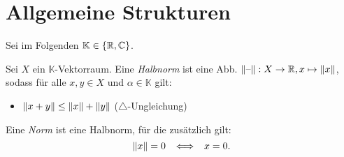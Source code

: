 \documentclass{cheat-sheet}
\newcommand{\K}{\mathbb{K}}
\begin{document}




\section{Allgemeine Strukturen}

\begin{nota}
  Sei im Folgenden $\K \in \{ \R, \C \}$.
\end{nota}

\begin{definition}
  Sei $X$ ein $\K$-Vektorraum. Eine \emph{Halbnorm} ist eine Abb. $\lVert\text{--}\rVert : X \to \mathbb{R}, x \mapsto \lVert x\rVert$, sodass für alle $x, y \in X$ und $\alpha \in \K$ gilt:
  \begin{itemize}
    \item $\lVert x + y\rVert \leq \lVert x\rVert + \lVert y\rVert$ \enspace ($\triangle$-Ungleichung)
  \end{itemize}
  Eine \emph{Norm} ist eine Halbnorm, für die zusätzlich gilt:
  \[ \lVert x\rVert = 0 \enspace \iff \enspace x = 0. \]
\end{definition}
\end{document}

